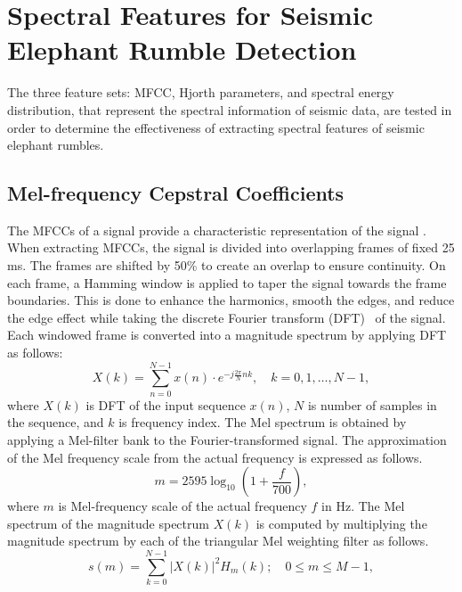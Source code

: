 \documentclass[applsci,article,accept,moreauthors,pdftex]{Definitions/mdpi}
\begin{document}
\section {Spectral Features for Seismic Elephant Rumble Detection}
The three feature sets: MFCC, Hjorth parameters, and spectral energy distribution, that represent the spectral information of seismic data, are tested in order to determine the effectiveness of extracting spectral features of seismic elephant rumbles.
\subsection{Mel-frequency Cepstral Coefficients}
The MFCCs of a signal provide a characteristic representation of the signal \cite{jurafsky}. When extracting MFCCs, the signal is divided into overlapping frames of fixed 25 ms. The frames are shifted by 50\% to create an overlap to ensure continuity. On each frame, a  Hamming window is applied to taper the signal towards the frame boundaries. This is done to enhance the harmonics, smooth the edges, and reduce the edge effect while taking the discrete Fourier transform (DFT)~\cite{oppenheim1999discrete} of the signal. Each windowed frame is converted into a magnitude spectrum by applying DFT as follows:
\begin{equation}
	X(k) = \sum_{n=0}^{N-1} x(n) \cdot e^{-j\frac{2\pi}{N}nk}, \quad k = 0, 1, \ldots, N-1,
\end{equation}
where $X(k)$ is DFT of the input sequence $x(n)$, $N$ is number of samples in the sequence, and $k$ is frequency index.
The Mel spectrum is obtained by applying a Mel-filter bank to the Fourier-transformed signal. The approximation of the Mel frequency scale from the actual frequency is expressed as follows.
\begin{equation}
	m = 2595 \log_{10}\left(1 + \frac{f}{700}\right),
\end{equation}
where $m$ is Mel-frequency scale of the actual frequency $f$ in Hz. The Mel spectrum of the magnitude spectrum $X(k)$ is computed by multiplying the magnitude spectrum by each of the  triangular Mel weighting filter as follows.
\begin{equation}
	s(m) = \sum_{k=0}^{N-1} |X(k)|^2 H_m(k) ; \quad 0 \leq m \leq M - 1,
\end{equation}
\end{document}
